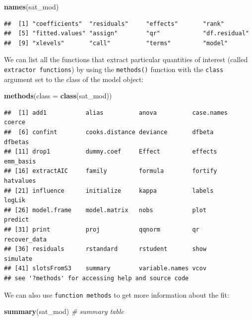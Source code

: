 \documentclass[]{book}
\newenvironment{Shaded}{\begin{snugshade}}{\end{snugshade}}
\newcommand{\CommentTok}[1]{\textcolor[rgb]{0.56,0.35,0.01}{\textit{#1}}}
\newcommand{\DataTypeTok}[1]{\textcolor[rgb]{0.13,0.29,0.53}{#1}}
\newcommand{\KeywordTok}[1]{\textcolor[rgb]{0.13,0.29,0.53}{\textbf{#1}}}
\newcommand{\NormalTok}[1]{#1}
\begin{document}
\begin{Shaded}
\begin{Highlighting}[]
  \KeywordTok{names}\NormalTok{(sat_mod)}
\end{Highlighting}
\end{Shaded}

\begin{verbatim}
##  [1] "coefficients"  "residuals"     "effects"       "rank"         
##  [5] "fitted.values" "assign"        "qr"            "df.residual"  
##  [9] "xlevels"       "call"          "terms"         "model"
\end{verbatim}

We can list all the functions that extract particular quantities of interest (called \texttt{extractor\ functions}) by using the \texttt{methods()} function with the \texttt{class} argument set to the class of the model object:

\begin{Shaded}
\begin{Highlighting}[]
\KeywordTok{methods}\NormalTok{(}\DataTypeTok{class =} \KeywordTok{class}\NormalTok{(sat_mod))}
\end{Highlighting}
\end{Shaded}

\begin{verbatim}
##  [1] add1           alias          anova          case.names     coerce        
##  [6] confint        cooks.distance deviance       dfbeta         dfbetas       
## [11] drop1          dummy.coef     Effect         effects        emm_basis     
## [16] extractAIC     family         formula        fortify        hatvalues     
## [21] influence      initialize     kappa          labels         logLik        
## [26] model.frame    model.matrix   nobs           plot           predict       
## [31] print          proj           qqnorm         qr             recover_data  
## [36] residuals      rstandard      rstudent       show           simulate      
## [41] slotsFromS3    summary        variable.names vcov          
## see '?methods' for accessing help and source code
\end{verbatim}

We can also use \texttt{function\ methods} to get more information about the fit:

\begin{Shaded}
\begin{Highlighting}[]
  \KeywordTok{summary}\NormalTok{(sat_mod) }\CommentTok{# summary table}
\end{Highlighting}
\end{Shaded}
\end{document}
